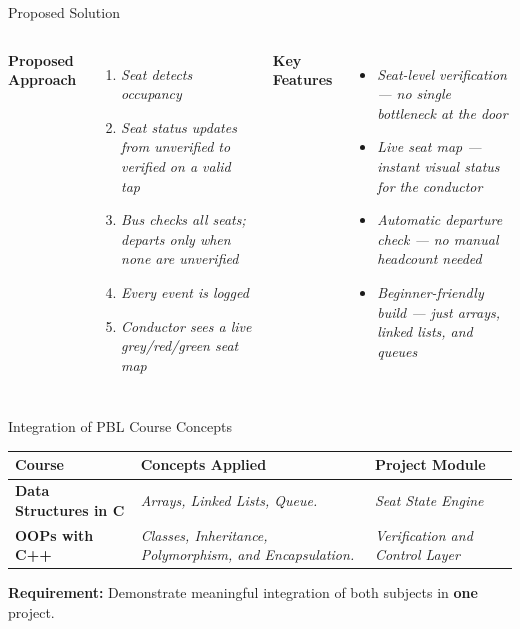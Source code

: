 \documentclass[aspectratio=169,11pt]{beamer}
\newcommand{\smallnote}[1]{\vspace{0.08cm}{\scriptsize\color{GEUGrey}#1}}
\newcommand{\placeholder}[1]{\textit{\color{GEUGrey}#1}}
\begin{document}
\begin{frame}{Proposed Solution}
\begin{columns}[T,totalwidth=\textwidth]
\textbf{\color{GEUBlue}Proposed Approach}
\begin{enumerate}\itemsep3pt
\item \placeholder{Seat detects occupancy}
\item \placeholder{Seat status updates from unverified to verified on a valid tap}
\item \placeholder{Bus checks all seats; departs only when none are unverified}
\item \placeholder{Every event is logged}
\item \placeholder{Conductor sees a live grey/red/green seat map}
\end{enumerate}
\textbf{\color{GEUBlue}Key Features}
\begin{itemize}\itemsep3pt
\item \placeholder{Seat-level verification — no single bottleneck at the door}
\item \placeholder{Live seat map — instant visual status for the conductor}
\item \placeholder{Automatic departure check — no manual headcount needed}
\item \placeholder{Beginner-friendly build — just arrays, linked lists, and queues}
\end{itemize}
\end{columns}
\vfill
\end{frame}

\begin{frame}{Integration of PBL Course Concepts}
\scriptsize
\begin{center}
\renewcommand{\arraystretch}{1.25}
\begin{tabularx}{.96\textwidth}{@{}>{\bfseries}p{3.0cm}X p{2.5cm}@{}}
\toprule
Course & Concepts Applied & Project Module\\
\midrule
Data Structures in C & \placeholder{Arrays, Linked Lists, Queue.} & \placeholder{Seat State Engine}\\
\midrule
OOPs with C++ & \placeholder{Classes, Inheritance, Polymorphism, and Encapsulation.} & \placeholder{Verification and Control Layer}\\
\bottomrule
\end{tabularx}
\end{center}
\vfill
\begin{center}
\colorbox{GEULightBlue}{\parbox{.86\textwidth}{\centering
\textbf{Requirement:} Demonstrate meaningful integration of both subjects in \textbf{one} project.}}
\end{center}
\end{frame}
\end{document}
